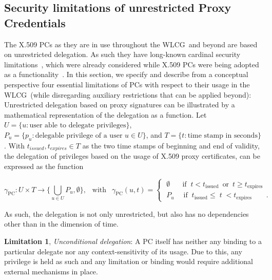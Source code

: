 \documentclass[10pt]{iopart}
\newcommand{\wlcg}{WLCG}
\begin{document}
\subsection{Security limitations of unrestricted Proxy Credentials}
\label{proxies}
The X.509 PCs as they are
in use throughout the \wlcg\ and beyond are based on unrestricted delegation.
As such they have long-known cardinal security limitations~\cite{proxy}, which
were already considered while X.509 PCs were being adopted as a functionality~\cite{x509delegation}.
In this section, we specify and describe from a 
conceptual perspective four
essential limitations of PCs
with respect to their usage
in the \wlcg\ (while disregarding auxiliary restrictions that can be 
applied beyond):\\ Unrestricted delegation based on proxy
signatures can be illustrated by a mathematical representation of
the delegation as a function.
Let
$U = \{ u: \textrm{user able to delegate privileges}\}$,
$P_{u} = \{ p_{u}: \textrm{delegable privilege of a user } u \in U\}$,
and $T = \{ t: \textrm{time stamp in seconds} \}$.
With  
$t_{issued},t_{expires} \in T$ as the two time stamps of beginning and
end of validity, the delegation of
privileges based on the usage of X.509 proxy certificates, can be expressed as the function
\begin{center}
\begin{equation}\tag{f 3.1}\label{e3.1}
\gamma_{\text{PC}}: U \times T \rightarrow
\{\bigcup \limits_{u \in U} P_{u},\emptyset\}, \;\;\ \text{with} \;\;\
\gamma_{\text{PC}}(u,t) = \begin{cases} \; \emptyset \;\;\, \quad \text{if}\;\;t
< t_{\text{issued}} \;\ \text{or} \;\ t \geq t_{\text{expires}} \\ \; P_{u}
\quad\;\text{if}\;\;t_{\text{issued}} \leq \; t\; <
t_{\text{expires}}\quad\quad.
\end{cases}
\end{equation}
\end{center}
As such, the delegation is not only unrestricted, but also has
no dependencies other than in the dimension of time.\\
\par
\begingroup
\leftskip=0.4cm
\noindent
\textbf{Limitation 1}, \textit{Unconditional delegation}:
A PC itself has neither any binding to a particular delegate nor any
context-sensitivity of its usage. Due to this, any privilege is held as
such and any limitation or binding would require additional external mechanisms in
place.\\
\end{document}
